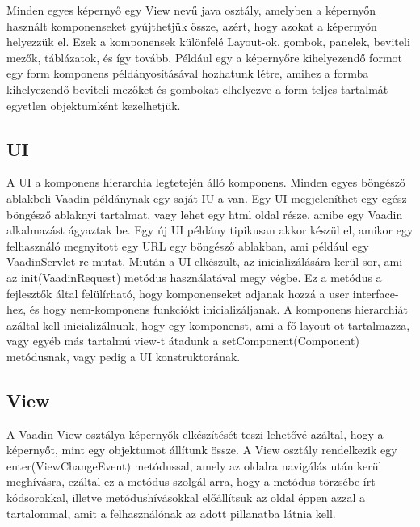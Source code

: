 \documentclass[centeredchapter]{thesis-ekf}
\theoremstyle{definition}
\theoremstyle{remark}
\begin{document}
Minden egyes képernyő egy View nevű java osztály, amelyben a képernyőn használt komponenseket gyújthetjük össze, azért, hogy azokat a képernyőn helyezzük el. Ezek a komponensek különfelé Layout-ok, gombok, panelek, beviteli mezők, táblázatok, és így tovább. Például egy a képernyőre kihelyezendő formot egy form komponens példányosításával hozhatunk létre, amihez a formba kihelyezendő beviteli mezőket és gombokat elhelyezve a form teljes tartalmát egyetlen objektumként kezelhetjük.

\subsection{UI}

A UI a komponens hierarchia legtetején álló komponens. Minden egyes böngésző ablakbeli 
Vaadin példánynak egy saját IU-a van. Egy UI megjeleníthet egy egész böngésző ablaknyi tartalmat, vagy lehet egy html oldal része, amibe egy Vaadin alkalmazást ágyaztak be.
Egy új UI példány tipikusan akkor készül el, amikor egy felhasználó megnyitott egy URL egy böngésző ablakban, ami például egy VaadinServlet-re mutat.
Miután a UI elkészült, az inicializálására kerül sor, ami az init(VaadinRequest) metódus használatával megy végbe. Ez a metódus a fejlesztők által felülírható, hogy komponenseket adjanak hozzá a user interface-hez, és hogy nem-komponens funkciókt inicializáljanak.
A komponens hierarchiát azáltal kell inicializálnunk, hogy egy komponenst, ami a fő layout-ot tartalmazza, vagy egyéb más tartalmú view-t átadunk a setComponent(Component) metódusnak, vagy pedig a UI konstruktorának.

\subsection{View}

A Vaadin View osztálya képernyők elkészítését teszi lehetővé azáltal, hogy a képernyőt, mint egy objektumot állítunk össze. A View osztály rendelkezik egy enter(ViewChangeEvent) metódussal, amely az oldalra navigálás után kerül meghívásra, ezáltal ez a metódus szolgál arra, hogy a metódus törzsébe írt kódsorokkal, illetve metódushívásokkal előállítsuk az oldal éppen azzal a tartalommal, amit a felhasználónak az adott pillanatba látnia kell.
\end{document}
